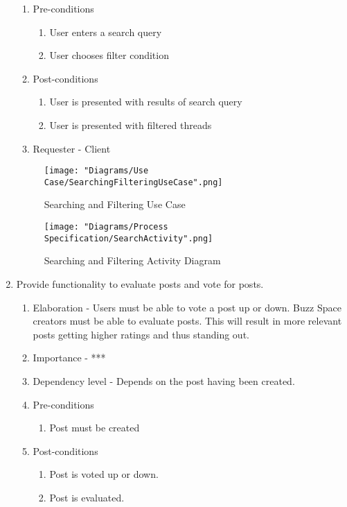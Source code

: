 \documentclass[12pt]{article}
\begin{document}
\begin{enumerate}
\begin{enumerate}
    \item Pre-conditions
    \begin{enumerate}
    	\item User enters a search query
    	\item User chooses filter condition
    \end{enumerate}
        \item Post-conditions
    \begin{enumerate}
    	\item User is presented with results of search query
    	\item User is presented with filtered threads
    \end{enumerate}
    \item Requester - Client
  \end{enumerate}
  \begin{figure}[h]	
  	\centering
	\texttt{[image: "Diagrams/Use Case/SearchingFilteringUseCase".png]}
	\caption{Searching and Filtering Use Case}
  \end{figure}
  \begin{figure}[h]
  \centering
	\texttt{[image: "Diagrams/Process Specification/SearchActivity".png]}
	\caption{Searching and Filtering Activity Diagram}
  \end{figure}
\clearpage %
   \item  Provide functionality to evaluate posts and vote for posts. %
  \begin{enumerate}
    \item Elaboration - Users must be able to vote a post up or down. Buzz Space creators must be able to evaluate posts. This will result in more relevant posts getting higher ratings and thus standing out.
    \item Importance - ***
    \item Dependency level - Depends on the post having been created.
    \item Pre-conditions
    \begin{enumerate}
    	\item Post must be created
    \end{enumerate}
        \item Post-conditions
    \begin{enumerate}
    	\item Post is voted up or down.
    	\item Post is evaluated.
    \end{enumerate}

\end{enumerate}
\end{enumerate}
\end{document}
